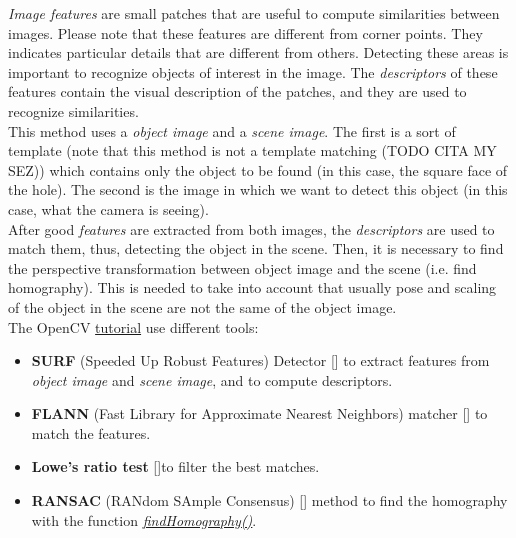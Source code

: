 \textit{Image features} are small patches that are useful to compute similarities between images. Please note that these features are different from corner points.
They indicates particular details that are different from others. Detecting these areas is important to recognize objects of interest in the image. The \textit{descriptors} of these features contain the visual description of the patches, and they are used to recognize similarities.\\
This method uses a \textit{object image} and a \textit{scene image}. The first is a sort of template (note that this method is not a template matching (TODO CITA MY SEZ)) %
which contains only the object to be found (in this case, the square face of the hole). The second is the image in which we want to detect this object (in this case, what the camera is seeing).\\
After good \textit{features} are extracted from both images, the \textit{descriptors} are used to match them, thus, detecting the object in the scene.
Then, it is necessary to find the perspective transformation between object image and the scene (i.e. find homography). This is needed to take into account that usually pose and scaling of the object in the scene are not the same of the object image.\\
The OpenCV \href{https://docs.opencv.org/3.4/d7/dff/tutorial_feature_homography.html}{tutorial} use different tools:
\begin{itemize}
	\item \textbf{SURF} (Speeded Up Robust Features) Detector [\cite{surfDet}] to extract features from \textit{object image} and \textit{scene image}, and to compute descriptors.
	\item \textbf{FLANN} (Fast Library for Approximate Nearest Neighbors) matcher [\cite{flannMatch}] to match the features.
	\item \textbf{Lowe's ratio test} [\cite{loweTest}]to filter the best matches.
	\item \textbf{RANSAC} (RANdom SAmple Consensus) [\cite{ransacHomog}] method to find the homography with the function \href{https://docs.opencv.org/3.4/d9/d0c/group__calib3d.html#ga4abc2ece9fab9398f2e560d53c8c9780}{\textit{findHomography()}}.
\end{itemize}

